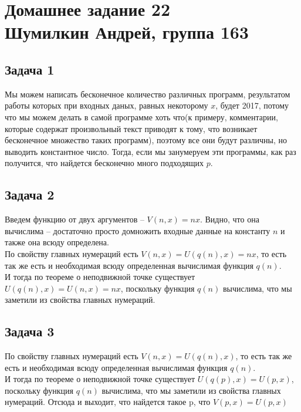 

	\section{Домашнее задание 22\\ Шумилкин Андрей, группа 163} 
	\subsection{Задача 1}
	Мы можем написать бесконечное количество различных программ, результатом работы которых при входных даных, равных некоторому $x$, будет 2017, потому что мы можем делать в самой программе хоть что(к примеру, комментарии, которые содержат произвольный текст приводят к тому, что возникает бесконечное множество таких программ), поэтому все они будут различны, но выводить константное число. Тогда, если мы занумеруем эти программы, как раз получится, что найдется бесконечно много подходящих $p$.
	
	\subsection{Задача 2} 
	Введем функцию от двух аргументов -- $V(n, x) = nx$. Видно, что она вычислима -- достаточно просто домножить входные данные на константу $n$ и также она всюду определена. \\
	По свойству главных нумераций есть $V(n, x) = U(q(n), x) = nx$, то есть так же есть и необходимая всюду определенная вычислимая функция $q(n)$. \\
	
	И тогда по теореме о неподвижной точке существует $U(q(n), x) = U(n, x) = nx$, поскольку функция $q(n)$ вычислима, что мы заметили из свойства главных нумераций. 
	
	\subsection{Задача 3} 
	По свойству главных нумераций есть $V(n, x) = U(q(n), x)$, то есть так же есть и необходимая всюду определенная вычислимая функция $q(n)$. \\
	
	И тогда по теореме о неподвижной точке существует $U(q(p), x) = U(p, x)$, поскольку функция $q(n)$ вычислима, что мы заметили из свойства главных нумераций. Отсюда и выходит, что найдется такое p, что $V(p, x) = U(p, x)$
	

